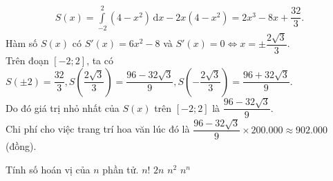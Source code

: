 \begin{ex}
{{}
		\begin{align*}
		S(x)=\displaystyle\int\limits_{-2}^2(4-x^2)\mathrm{\,d}x-2x(4-x^2)=2x^3-8x+\dfrac{32}{3}.
		\end{align*}
		Hàm số $S(x)$ có $S'(x)=6x^2-8$ và $S'(x)=0 \Leftrightarrow x=\pm\dfrac{2\sqrt{3}}{3}$.
		\\	Trên đoạn $[-2;2]$, ta có $S(\pm2)=\dfrac{32}{3}, S\left(\dfrac{2\sqrt{3}}{3}\right)=\dfrac{96-32\sqrt{3}}{9}, S\left(-\dfrac{2\sqrt{3}}{3}\right)=\dfrac{96+32\sqrt{3}}{9}$.\\
		Do đó giá trị nhỏ nhất của $S(x)$ trên $[-2;2]$ là $\dfrac{96-32\sqrt{3}}{9}$.\\
		Chi phí cho việc trang trí hoa văn lúc đó là $\dfrac{96-32\sqrt{3}}{9}\times 200.000 \approx 902.000$ (đồng).
	}
\end{ex}

\begin{ex}%
	Tính số hoán vị của $n$ phần tử.
	\choice
	{\True $n! $}
	{$ 2n$}
	{$n^2 $}
	{$n^n $}
\end{ex}

